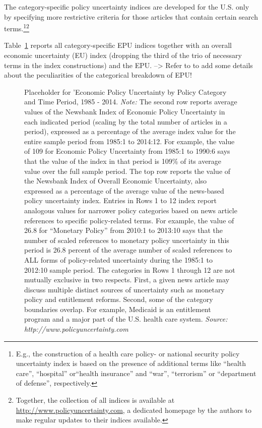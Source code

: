 \documentclass[a4paper,11pt,listof=nochaptergap,oneside,pointednumbers,bibtotoc,bigheadings,liststotoc]{scrbook}
\theoremstyle{mysatz}
\theoremstyle{mydefinition}
\theoremstyle{mybemerkung}
\begin{document}
The category-specific policy uncertainty indices are developed for the U.S. only by specifying more restrictive criteria for those articles that contain certain search terms.\footnote{E.g., the construction of a health care policy- or national security policy uncertainty index is based on the presence of additional terms like ``health care'', ``hospital'' or``health insurance'' and ``war'', ``terrorism'' or ``department of defense'', respectively.}\footnote{Together, the collection of all indices is available at \url{http://www.policyuncertainty.com}, a dedicated homepage by the authors to make regular updates to their indices available.}

Table~\ref{fig:epuindex_categories} reports all category-specific EPU indices together with an overall economic uncertainty (EU) index (dropping the third of the trio of necessary terms in the index constructions) and the EPU. --> Refer to \citet[p. 1602]{bakeretal:15} to add some details about the peculiarities of the categorical breakdown of EPU!


 \begin{figure}[!h]
   \centering
   \setlength\fboxsep{0pt}
   \setlength\fboxrule{0pt}
      \caption[Placeholder for 'Economic Policy Uncertainty by Policy Category and Time Period, 1985 - 2014.]{Placeholder for 'Economic Policy Uncertainty by Policy Category and Time Period, 1985 - 2014.
      \textit{Note:} The second row reports average values of the Newsbank Index of Economic Policy Uncertainty in each indicated period (scaling by the total number of articles in a period), expressed as a percentage of the average index value for the entire sample period from 1985:1 to 2014:12. For example, the value of 109 for Economic Policy Uncertainty from 1985:1 to 1990:6 says that the value of the index in that period is 109\% of its average value over the full sample period. The top row reports the value of the Newsbank Index of Overall Economic Uncertainty, also expressed as a percentage of the average value of the news-based policy uncertainty index. Entries in Rows 1 to 12 index report analogous values for narrower policy categories based on news article references to specific policy-related terms. For example, the value of 26.8 for “Monetary Policy” from 2010:1 to 2013:10 says that the number of scaled references to monetary policy uncertainty in this period is 26.8 percent of the
average number of scaled references to ALL forms of policy-related uncertainty during the 1985:1 to 2012:10 sample period. The categories in Rows 1 through 12 are not mutually exclusive in two respects. First, a given news article may discuss multiple distinct sources of uncertainty such as monetary policy and entitlement reforms. Second, some of the category boundaries overlap. For example, Medicaid is an entitlement program and a major part of the U.S. health care system. \textit{Source: http://www.policyuncertainty.com}}   \label{fig:epuindex_categories}
\end{figure}
\end{document}
